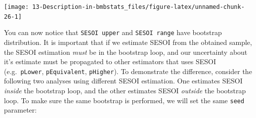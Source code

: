 \documentclass[
]{book}
\begin{document}
\begin{center}\texttt{[image: 13-Description-in-bmbstats\_files/figure-latex/unnamed-chunk-26-1]} \end{center}

You can now notice that \texttt{SESOI\ upper} and \texttt{SESOI\ range} have bootstrap distribution. It is important that if we estimate SESOI from the obtained sample, the SESOI estimation \emph{must} be in the bootstrap loop, and our uncertainty about it's estimate must be propagated to other estimators that uses SESOI (e.g.~\texttt{pLower}, \texttt{pEquivalent}, \texttt{pHigher}). To demonstrate the difference, consider the following two analyses using different SESOI estimation. One estimates SESOI \emph{inside} the bootstrap loop, and the other estimates SESOI \emph{outside} the bootstrap loop. To make sure the same bootstrap is performed, we will set the same \texttt{seed} parameter:
\end{document}
